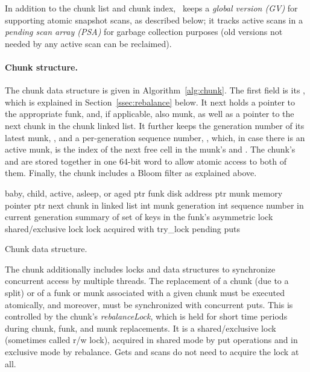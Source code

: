 In addition to the chunk list and chunk index, \sys\ keeps a \emph{global version (GV)} for supporting atomic snapshot scans,
as described below; it tracks active scans in a \emph{pending scan array (PSA)} for garbage collection purposes (old 
versions not needed by any active scan can be reclaimed).

\paragraph{Chunk structure.}

The chunk data structure is given in Algorithm~\ref{alg:chunk}. 
The first field is its , which is explained in Section~\ref{ssec:rebalance}  below. 
It next holds a pointer to the appropriate funk, and, if applicable, also munk, as well as a pointer to the next 
chunk in the chunk linked list.
It further keeps the generation number of its latest munk, , and a per-generation sequence number,
, which, in case there is an active munk, is the index of the next free cell in the munk's    and . The chunk's  and  are stored together in one 64-bit word to allow 
atomic access to both of them. 
Finally, the chunk includes a Bloom filter as explained above.

\begin{algorithm}[htb]

\begin{algorithmic}
\State {} \Comment  baby, child, active, asleep, or aged
\State ptr  \Comment funk disk address
\State ptr  \Comment munk memory pointer
\State ptr  \Comment next chunk in linked list
\State int  \Comment munk generation
\State int  \Comment sequence number in current generation 
\State {} \Comment summary of set of keys in the funk's 
\State asymmetric lock  \Comment shared/exclusive lock 
\State lock  \Comment acquired with try\_lock 
\State {} \Comment pending puts
\end{algorithmic}

\caption{Chunk data structure.}
\label{alg:chunk}
\end{algorithm}


The chunk additionally includes locks and data structures to synchronize concurrent access by multiple threads.
The replacement of a chunk (due to a split) or of a funk or munk associated with a given chunk 
must be executed atomically, and moreover, must be synchronized with concurrent puts. 
This is controlled by the chunk's \emph{rebalanceLock}, which is held for short time periods
during chunk, funk, and munk replacements.  It is a shared/exclusive lock (sometimes called r/w lock), acquired in shared mode 
by put operations and in exclusive mode by rebalance. Gets and scans do not need to acquire the lock at all.


